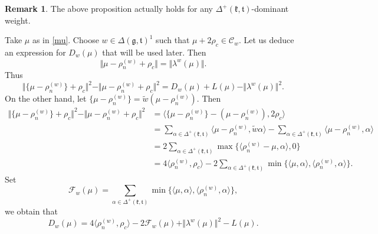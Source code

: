 \documentclass[11pt]{amsart}
\theoremstyle{plain}
\theoremstyle{definition}
\newtheorem{rmk}[thm]{Remark}
\newcommand{\mfg}{\mathfrak{g}}
\newcommand{\frk}{\mathfrak{k}}
\newcommand{\mfk}{\mathfrak{k}}
\newcommand{\frt}{\mathfrak{t}}
\newcommand{\mft}{\mathfrak{t}}
\newcommand{\C}{\mathcal{C}}
\newcommand{\F}{\mathcal{F}}
\begin{document}
\begin{rmk}
The above proposition actually holds for any $\Delta^+(\frk, \frt)$-dominant weight.
\end{rmk}



Take $\mu$ as in \eqref{mu}. Choose $w\in \Delta(\mfg,\mft)^1$ such that $\mu+2\rho_c\in \C_w$.
Let us deduce an expression for $D_w(\mu)$ that will be used later.  
 Then
\[\Vert\mu-\rho^{(w)}_n+\rho_c\Vert=\Vert\lambda^w(\mu)\Vert.\]
Thus
\[\Vert \{\mu-\rho^{(w)}_n\}+\rho_c\Vert^2-\Vert\mu-\rho^{(w)}_n+\rho_c\Vert^2=D_w(\mu)+L(\mu)-\Vert\lambda^w(\mu)\Vert^2.\]
On the other hand, let $\{\mu-\rho_n^{(w)}\}=\widetilde{w}(\mu-\rho_n^{(w)})$. Then
\begin{align*}
	\Vert \{\mu-\rho^{(w)}_n\}+\rho_c\Vert^2-\Vert\mu-\rho^{(w)}_n+\rho_c\Vert^2&=\langle\{\mu-\rho_n^{(w)}\}-(\mu-\rho_n^{(w)}),2\rho_c \rangle\\
	&=\sum_{\alpha\in\Delta^+(\mfk,\mft)}\langle\mu-\rho_n^{(w)}, \widetilde{w}\alpha\rangle-\sum_{\alpha\in\Delta^+(\mfk,\mft)}\langle\mu-\rho_n^{(w)}, \alpha\rangle\\
	&=2\sum_{\alpha\in\Delta^+(\mfk,\mft)}\max\{\langle\rho_n^{(w)}-\mu,\alpha\rangle,0\}\\
	&=4\langle\rho_n^{(w)},\rho_c\rangle-2\sum_{\alpha\in\Delta^+(\mfk,\mft)}\min\{\langle\mu,\alpha\rangle,\langle\rho_n^{(w)},\alpha\rangle\}.
\end{align*}
Set
\begin{equation}\label{Fw}
	\F_w(\mu)=\sum_{\alpha\in\Delta^+(\mfk,\mft)}\min\{\langle\mu,\alpha\rangle,\langle\rho_n^{(w)},\alpha\rangle\},
\end{equation}
we obtain that
\begin{equation}\label{Dw-decom}
	D_w(\mu)=4\langle \rho_n^{(w)},\rho_c\rangle -2\F_w(\mu)+\Vert\lambda^w(\mu)\Vert^2-L(\mu).
\end{equation}
\end{document}

